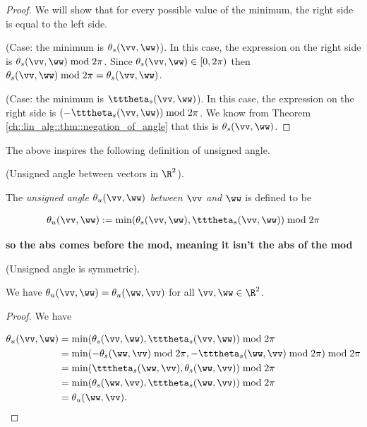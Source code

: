 \begin{proof}
    We will show that for every possible value of the minimum, the right side is equal to the left side. 
    
    (Case: the minimum is $\theta_s(\vv, \ww)$). In this case, the expression on the right side is $\theta_s(\vv, \ww) \bmod 2\pi$. Since $\theta_s(\vv, \ww) \in [0, 2\pi)$ then $\theta_s(\vv, \ww) \bmod 2\pi = \theta_s(\vv, \ww)$.

    (Case: the minimum is $\tttheta_s(\vv, \ww)$). In this case, the expression on the right side is $(-\tttheta_s(\vv, \ww)) \bmod 2\pi$. We know from Theorem \ref{ch::lin_alg::thm::negation_of_angle} that this is $\theta_s(\vv, \ww)$.
\end{proof}

The above inspires the following definition of unsigned angle.

\begin{defn}
    (Unsigned angle between vectors in $\R^2$).

    The \textit{unsigned angle $\theta_u(\vv, \ww)$ between $\vv$ and $\ww$} is defined to be

    \begin{align*}
        \theta_u(\vv, \ww) := \min(\theta_s(\vv, \ww), \tttheta_s(\vv, \ww)) \bmod 2\pi
    \end{align*}

    \textbf{so the abs comes before the mod, meaning it isn't the abs of the mod}
\end{defn}

\begin{theorem}
    (Unsigned angle is symmetric).

    We have $\theta_u(\vv, \ww) = \theta_u(\ww, \vv)$ for all $\vv, \ww \in \R^2$.
\end{theorem}

\begin{proof}
    We have

    \begin{align*}
        \theta_u(\vv, \ww) &= \min(\theta_s(\vv, \ww), \tttheta_s(\vv, \ww)) \bmod 2\pi \\
        &= \min(-\theta_s(\ww, \vv) \bmod 2\pi, -\tttheta_s(\ww, \vv) \bmod 2\pi) \bmod 2\pi \\
        &= \min(\tttheta_s(\ww, \vv), \theta_s(\ww, \vv)) \bmod 2\pi \\
        &= \min(\theta_s(\ww, \vv), \tttheta_s(\ww, \vv)) \bmod 2\pi \\
        &= \theta_u(\ww, \vv).
    \end{align*}
\end{proof}

